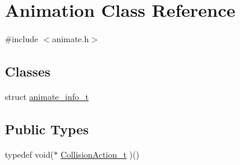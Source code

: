 \hypertarget{a00010}{\section{Animation Class Reference}
\label{a00010}
}


{\ttfamily \#include $<$animate.\-h$>$}

\subsection*{Classes}
\begin{DoxyCompactItemize}
\item 
struct \hyperlink{a00002}{animate\-\_\-info\-\_\-t}
\end{DoxyCompactItemize}
\subsection*{Public Types}
\begin{DoxyCompactItemize}
\item 
typedef void($\ast$ \hyperlink{a00010_acf8ace9aee0e09e12c10002bcde0459c}{Collision\-Action\-\_\-t} )()
\end{DoxyCompactItemize}
